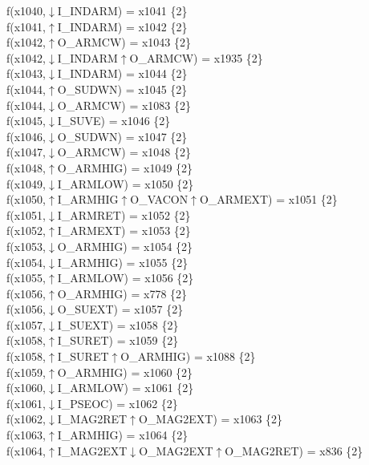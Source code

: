 f(x1040,$\downarrow$I\_INDARM) = x1041 \{2\} \\  
f(x1041,$\uparrow$I\_INDARM) = x1042 \{2\} \\  
f(x1042,$\uparrow$O\_ARMCW) = x1043 \{2\} \\  
f(x1042,$\downarrow$I\_INDARM$\uparrow$O\_ARMCW) = x1935 \{2\} \\  
f(x1043,$\downarrow$I\_INDARM) = x1044 \{2\} \\  
f(x1044,$\uparrow$O\_SUDWN) = x1045 \{2\} \\  
f(x1044,$\downarrow$O\_ARMCW) = x1083 \{2\} \\  
f(x1045,$\downarrow$I\_SUVE) = x1046 \{2\} \\  
f(x1046,$\downarrow$O\_SUDWN) = x1047 \{2\} \\  
f(x1047,$\downarrow$O\_ARMCW) = x1048 \{2\} \\  
f(x1048,$\uparrow$O\_ARMHIG) = x1049 \{2\} \\  
f(x1049,$\downarrow$I\_ARMLOW) = x1050 \{2\} \\  
f(x1050,$\uparrow$I\_ARMHIG$\uparrow$O\_VACON$\uparrow$O\_ARMEXT) = x1051 \{2\} \\  
f(x1051,$\downarrow$I\_ARMRET) = x1052 \{2\} \\  
f(x1052,$\uparrow$I\_ARMEXT) = x1053 \{2\} \\  
f(x1053,$\downarrow$O\_ARMHIG) = x1054 \{2\} \\  
f(x1054,$\downarrow$I\_ARMHIG) = x1055 \{2\} \\  
f(x1055,$\uparrow$I\_ARMLOW) = x1056 \{2\} \\  
f(x1056,$\uparrow$O\_ARMHIG) = x778 \{2\} \\  
f(x1056,$\downarrow$O\_SUEXT) = x1057 \{2\} \\  
f(x1057,$\downarrow$I\_SUEXT) = x1058 \{2\} \\  
f(x1058,$\uparrow$I\_SURET) = x1059 \{2\} \\  
f(x1058,$\uparrow$I\_SURET$\uparrow$O\_ARMHIG) = x1088 \{2\} \\  
f(x1059,$\uparrow$O\_ARMHIG) = x1060 \{2\} \\  
f(x1060,$\downarrow$I\_ARMLOW) = x1061 \{2\} \\  
f(x1061,$\downarrow$I\_PSEOC) = x1062 \{2\} \\  
f(x1062,$\downarrow$I\_MAG2RET$\uparrow$O\_MAG2EXT) = x1063 \{2\} \\  
f(x1063,$\uparrow$I\_ARMHIG) = x1064 \{2\} \\  
f(x1064,$\uparrow$I\_MAG2EXT$\downarrow$O\_MAG2EXT$\uparrow$O\_MAG2RET) = x836 \{2\} \\  
